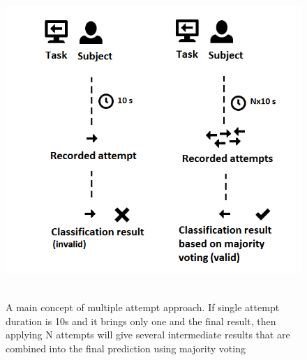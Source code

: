 \documentclass[12pt]{article}
\theoremstyle{definition}
\begin{document}
\begin{figure} [H]
\begin{center}
\includegraphics[height=12cm, width=1\textwidth]{main}
\caption{A main concept of multiple attempt approach. If single attempt duration is 10s and it brings only one and the final result, then applying N attempts will give several intermediate results that are combined into the final prediction using majority voting}
\label{fig:condorcet}
\end{center}
\end{figure}
\end{document}
